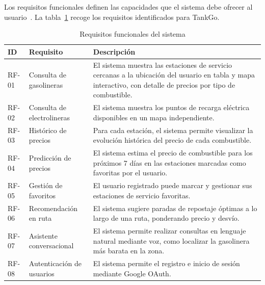 Los requisitos funcionales definen las capacidades que el sistema debe ofrecer al
usuario~\cite{sommerville2011}. La tabla~\ref{tab:rf} recoge los requisitos identificados
para TankGo.
\begin{table}[H]
  \centering
  \caption{Requisitos funcionales del sistema}
  \label{tab:rf}
  \begin{tabular}{llp{9cm}}
    \toprule
    \textbf{ID} & \textbf{Requisito}         & \textbf{Descripción}                                                                                                                                           \\
    \midrule
    RF-01       & Consulta de gasolineras    & El sistema muestra las estaciones de servicio cercanas a la ubicación del usuario en tabla y mapa interactivo, con detalle de precios por tipo de combustible. \\
    RF-02       & Consulta de electrolineras & El sistema muestra los puntos de recarga eléctrica disponibles en un mapa independiente.                                                                       \\
    RF-03       & Histórico de precios       & Para cada estación, el sistema permite visualizar la evolución histórica del precio de cada combustible.                                                       \\
    RF-04       & Predicción de precios      & El sistema estima el precio de combustible para los próximos 7 días en las estaciones marcadas como favoritas por el usuario.                                  \\
    RF-05       & Gestión de favoritos       & El usuario registrado puede marcar y gestionar sus estaciones de servicio favoritas.                                                                           \\
    RF-06       & Recomendación en ruta      & El sistema sugiere paradas de repostaje óptimas a lo largo de una ruta, ponderando precio y desvío.                                                            \\
    RF-07       & Asistente conversacional   & El sistema permite realizar consultas en lenguaje natural mediante voz, como localizar la gasolinera más barata en la zona.                                    \\
    RF-08       & Autenticación de usuarios  & El sistema permite el registro e inicio de sesión mediante Google OAuth.                                                                                       \\
    \bottomrule
  \end{tabular}
\end{table}

